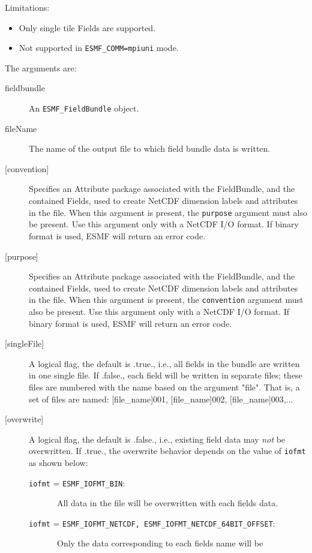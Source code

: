    Limitations:
   \begin{itemize}
   \item Only single tile Fields are supported.
   \item Not supported in {\tt ESMF\_COMM=mpiuni} mode.
   \end{itemize}
  
   The arguments are:
   \begin{description}
   \item[fieldbundle]
   An {\tt ESMF\_FieldBundle} object.
   \item[fileName]
   The name of the output file to which field bundle data is written.
   \item[{[convention]}]
   Specifies an Attribute package associated with the FieldBundle, and the
   contained Fields, used to create NetCDF dimension labels and attributes
   in the file. When this argument is present, the {\tt purpose}
   argument must also be present. Use this argument only with a NetCDF
   I/O format. If binary format is used, ESMF will return an error code.
   \item[{[purpose]}]
   Specifies an Attribute package associated with the FieldBundle, and the
   contained Fields, used to create NetCDF dimension labels and attributes
   in the file. When this argument is present, the {\tt convention}
   argument must also be present. Use this argument only with a NetCDF
   I/O format. If binary format is used, ESMF will return an error code.
   \item[{[singleFile]}]
   A logical flag, the default is .true., i.e., all fields in the bundle
   are written in one single file. If .false., each field will be written
   in separate files; these files are numbered with the name based on the
   argument "file". That is, a set of files are named: [file\_name]001,
   [file\_name]002, [file\_name]003,...
   \item[{[overwrite]}]
   \begin{sloppypar}
   A logical flag, the default is .false., i.e., existing field data may
   {\em not} be overwritten. If .true., the overwrite behavior depends
   on the value of {\tt iofmt} as shown below:
   \begin{description}
   \item[{\tt iofmt} = {\tt ESMF\_IOFMT\_BIN}:]\ All data in the file will
   be overwritten with each fields data.
   \item[{\tt iofmt} = {\tt ESMF\_IOFMT\_NETCDF, ESMF\_IOFMT\_NETCDF\_64BIT\_OFFSET}:]\ Only the
   data corresponding to each fields name will be

\end{description}
\end{sloppypar}
\end{description}
